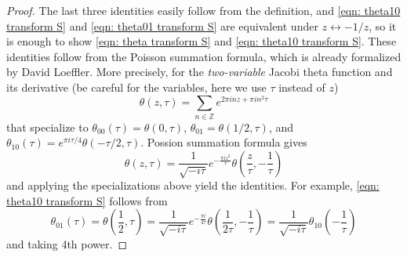 \begin{proof}
The last three identities easily follow from the definition, and \eqref{eqn: theta10 transform S} and \eqref{eqn: theta01 transform S} are equivalent under $z \leftrightarrow -1/z$, so it is enough to show \eqref{eqn: theta transform S} and \eqref{eqn: theta10 transform S}.
These identities follow from the Poisson summation formula, which is already formalized by David Loeffler.
More precisely, for the \emph{two-variable} Jacobi theta function and its derivative (be careful for the variables, here we use $\tau$ instead of $z$)
\begin{equation}
    \theta(z, \tau) = \sum_{n \in \mathbb{Z}} e^{2 \pi i n z + \pi i n^2 \tau} \label{eqn:jacobi2}
\end{equation}
that specialize to $\theta_{00}(\tau) = \theta(0, \tau)$, $\theta_{01} = \theta(1/2, \tau)$, and $\theta_{10}(\tau) = e^{\pi i \tau / 4} \theta(-\tau / 2, \tau)$.
Possion summation formula gives
\begin{equation}
    \theta(z, \tau) = \frac{1}{\sqrt{-i \tau}} e^{-\frac{\pi i z^2}{\tau}} \theta\left(\frac{z}{\tau}, -\frac{1}{\tau}\right) \label{eqn:jacobi2transform}
\end{equation}
and applying the specializations above yield the identities.
For example, \eqref{eqn: theta10 transform S} follows from
\begin{equation}
    \theta_{01}(\tau) = \theta\left(\frac{1}{2}, \tau\right) = \frac{1}{\sqrt{-i\tau}} e^{- \frac{\pi i }{4 \tau}} \theta\left(\frac{1}{2 \tau}, -\frac{1}{\tau}\right) = \frac{1}{\sqrt{-i\tau}} \theta_{10}\left(-\frac{1}{\tau}\right)
\end{equation}
and taking 4th power.
\end{proof}

